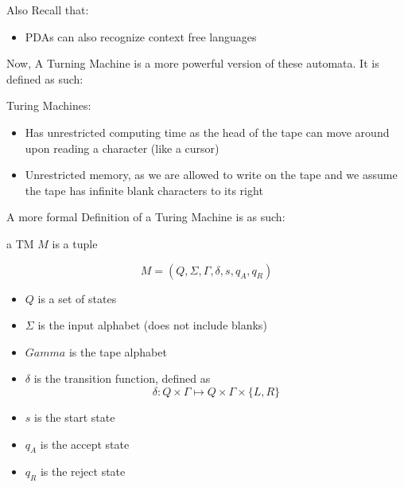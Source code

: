 \documentclass[12pt]{article}
\begin{document}
Also Recall that:
\begin{itemize}
    \item PDAs can also recognize context free languages
\end{itemize}

Now, A Turning Machine is a more powerful version of these automata. It is defined as such:

\begin{tcolorbox}
 Turing Machines:
 \begin{itemize}
     \item Has unrestricted computing time as the head of the tape can move around upon reading a character (like a cursor)
     \item Unrestricted memory, as we are allowed to write on the tape and we assume the tape has infinite blank characters to its right
 \end{itemize}
\end{tcolorbox}

A more formal Definition of a Turing Machine is as such:
\begin{tcolorbox}
 a TM $M$ is a tuple
 
 $$M = (Q, \Sigma, \Gamma, \delta, s, q_A, q_R)$$
 
 \begin{itemize}
     \item $Q$ is a set of states
     \item $\Sigma$ is the input alphabet (does not include blanks)
     \item $Gamma$ is the tape alphabet
     \item $\delta$ is the transition function, defined as $$\delta: Q \times \Gamma \mapsto Q \times \Gamma \times \{ L,R \}$$
     \item $s$ is the start state
     \item $q_A$ is the accept state
     \item $q_R$ is the reject state
 \end{itemize}
 
\end{tcolorbox}
\end{document}
